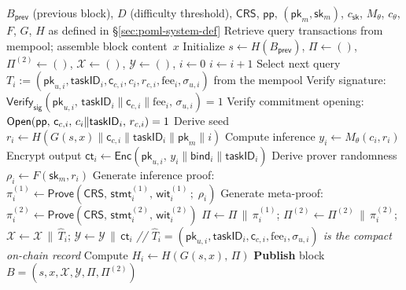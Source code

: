 \begin{algorithm}[t]
\caption{PoML Block Production}
\label{alg:poml-main}
\begin{algorithmic}[1]
\Require $B_{\mathsf{prev}}$ (previous block), $D$ (difficulty threshold), $\mathsf{CRS}$, $\mathsf{pp}$, $(\mathsf{pk}_m, \mathsf{sk}_m)$, $c_{\mathsf{sk}}$, $M_\theta$, $c_\theta$, $F$, $G$, $H$ as defined in \S\ref{sec:poml-system-def}
\State Retrieve query transactions from mempool; assemble block content~$x$
\State Initialize $s \gets H(B_{\mathsf{prev}})$, $\Pi \gets ()$, $\Pi^{(2)} \gets ()$, $\mathcal{X} \gets ()$, $\mathcal{Y} \gets ()$, $i \gets 0$
\Repeat
    \State $i \gets i + 1$
    \State Select next query 
    \Statex \qquad $T_i := (\mathsf{pk}_{u,i}, \mathsf{taskID}_i, \mathsf{c}_{c,i}, c_i, r_{c,i}, \text{fee}_i, \sigma_{u,i})$ 
    \Statex \qquad from the mempool
    \State Verify signature:
    \Statex \qquad $\mathsf{Verify}_{\mathsf{sig}}(\mathsf{pk}_{u,i},\, \mathsf{taskID}_i \| \mathsf{c}_{c,i} \| \text{fee}_i,\, \sigma_{u,i}) = 1$
    \State Verify commitment opening:
    \Statex \qquad $\mathsf{Open}(\mathsf{pp},\, \mathsf{c}_{c,i},\, c_i \| \mathsf{taskID}_i,\, r_{c,i}) = 1$
    \State Derive seed $r_i \gets H(G(s,x) \parallel \mathsf{c}_{c,i} \parallel \mathsf{taskID}_i \parallel \mathsf{pk}_m \parallel i)$
    \State Compute inference $y_i \gets M_\theta(c_i, r_i)$
    \State Encrypt output $\mathsf{ct}_i \gets \mathsf{Enc}(\mathsf{pk}_{u,i},\, y_i \parallel \mathsf{bind}_i \parallel \mathsf{taskID}_i)$
    \State Derive prover randomness $\rho_i \gets F(\mathsf{sk}_m, r_i)$
    \State Generate inference proof:
    \Statex \qquad $\pi_i^{(1)} \gets \mathsf{Prove}(\mathsf{CRS},\, \mathsf{stmt}_i^{(1)},\, \mathsf{wit}_i^{(1)}\,;\; \rho_i)$
    \State Generate meta-proof:
    \Statex \qquad $\pi_i^{(2)} \gets \mathsf{Prove}(\mathsf{CRS},\, \mathsf{stmt}_i^{(2)},\, \mathsf{wit}_i^{(2)})$
    \State $\Pi \gets \Pi \,\|\, \pi_i^{(1)}$; $\Pi^{(2)} \gets \Pi^{(2)} \,\|\, \pi_i^{(2)}$; 
    \Statex \qquad $\mathcal{X} \gets \mathcal{X} \,\|\, \hat{T}_i$; $\mathcal{Y} \gets \mathcal{Y} \,\|\, \mathsf{ct}_i$
    \Statex \qquad \textit{// $\hat{T}_i = (\mathsf{pk}_{u,i}, \mathsf{taskID}_i, \mathsf{c}_{c,i}, \text{fee}_i, \sigma_{u,i})$ is the compact on-chain record}
    \State Compute $H_i \gets H(G(s,x),\, \Pi)$
\State \textbf{Publish} block $B = (s, x, \mathcal{X}, \mathcal{Y}, \Pi, \Pi^{(2)})$
\end{algorithmic}
\end{algorithm}